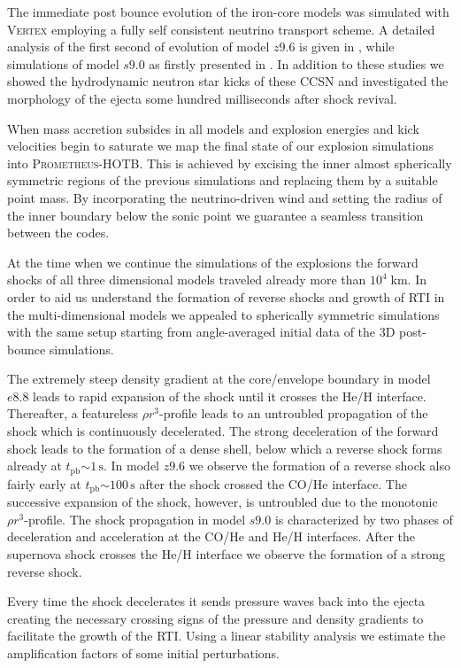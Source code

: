 \documentclass[fleqn,usenatbib]{mnras}
\newcommand{\tpb}{\ensuremath{t_{\text{pb}}}}
\newcommand{\s}{\ensuremath{\text{s}}}
\newcommand{\prom}{\textsc{Prometheus-HOTB}\xspace}
\newcommand{\vertex}{\textsc{Vertex}\xspace}
\begin{document}
The immediate post bounce evolution of the iron-core models was 
simulated with \vertex employing a fully self consistent neutrino 
transport scheme. A detailed analysis of the first second of 
evolution of model $z9.6$ is given in \citet{Melson2015a}, 
while simulations of model $s9.0$ as firstly presented in \citet{Melson2019}. 
In addition to these studies we showed the 
hydrodynamic neutron star kicks of these 
CCSN and investigated the morphology of the ejecta some 
hundred milliseconds after shock revival. 

When mass accretion subsides in all models and 
explosion energies and kick velocities begin to saturate 
we map the final state of our explosion simulations into \prom. 
This is achieved by excising the inner almost spherically symmetric 
regions of the previous simulations and replacing them by a 
suitable point mass. By incorporating the neutrino-driven wind
and setting the radius of the inner boundary below the sonic 
point we guarantee a seamless transition between the codes.

At the time when we continue the simulations of the explosions 
the forward shocks of all three dimensional models traveled 
already more than $10^4\;\mathrm{km}$. 
In order to aid us understand the formation of reverse shocks and
growth of RTI in the multi-dimensional models we appealed to spherically
symmetric simulations with the same setup starting from angle-averaged initial data
of the 3D post-bounce simulations.

The extremely steep density gradient at the core/envelope boundary
in model $e8.8$ leads to rapid expansion 
of the shock until it crosses the He/H interface.
Thereafter, a featureless $\rho r^3$-profile leads to an untroubled 
propagation of the shock which is continuously decelerated.
The strong deceleration of the forward shock leads to the formation of a 
dense shell, below which a reverse shock forms already at $\tpb\mathord{\sim}1\,\s$.
In model $z9.6$ we observe the formation of a reverse shock also fairly early at
$\tpb\mathord{\sim}100\,\s$ after the shock crossed the CO/He interface.
The successive expansion of the shock, however, is untroubled due to the 
monotonic $\rho r^3$-profile.
The shock propagation in model $s9.0$ is characterized by two phases of
deceleration and acceleration at the CO/He and He/H interfaces.
After the supernova shock crosses the He/H interface we observe the
formation of a strong reverse shock.

Every time the shock decelerates it sends pressure waves back into
the ejecta creating the necessary crossing signs of the
pressure and density gradients to facilitate the growth of the RTI. 
Using a linear stability analysis we estimate the amplification
factors of some initial perturbations.
\end{document}
